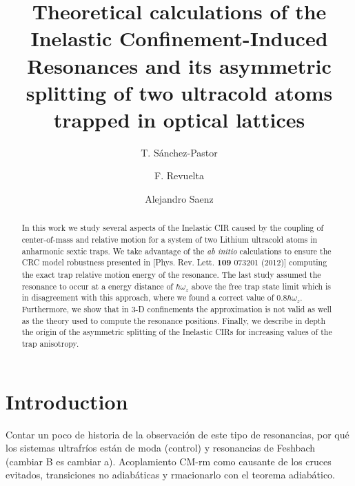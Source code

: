 \documentclass[aps,pre,twocolumn,superscriptaddress,showpacs]{revtex4-1}
\newcommand{\abinitio}{\textit{ab initio }}
\begin{document}
\title{Theoretical calculations of the Inelastic Confinement-Induced Resonances and its asymmetric splitting of two ultracold atoms trapped in optical lattices}
%
\author{T. S\'anchez-Pastor}

\author{F. Revuelta}

\author{Alejandro Saenz}
%
\begin{abstract}
	In this work we study several aspects of the Inelastic CIR caused by the coupling of center-of-mass and relative motion for a system of two Lithium 		ultracold atoms in anharmonic sextic traps. We take advantage of the \abinitio calculations to ensure the CRC model robustness presented in [Phys. 	Rev. Lett. \textbf{109} 073201 (2012)] computing the exact trap relative motion energy of the resonance. The last study assumed the resonance to occur 	at a energy distance of $\hbar \omega_z$ above the free trap state limit which is in disagreement with this approach, where we found a correct value of 	$0.8\hbar \omega_z$. Furthermore, we show that in 3-D confinements the approximation is not valid as well as the theory used to compute the 		resonance positions. Finally, we describe in depth the origin of the asymmetric splitting of the Inelastic CIRs for increasing values of the trap anisotropy.
\end{abstract}

\maketitle

\section{Introduction}  \label{sec:intro}
	Contar un poco de historia de la observación de este tipo de resonancias, por qué los sistemas ultrafríos están de moda (control) y resonancias de 		Feshbach (cambiar B es cambiar a). Acoplamiento CM-rm como causante de los cruces evitados, transiciones no adiabáticas y rmacionarlo con el 		teorema adiabático.
\end{document}
